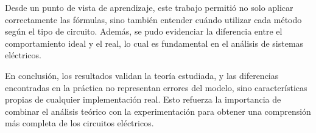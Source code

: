 \documentclass[conference]{IEEEtran}
\begin{document}
Desde un punto de vista de aprendizaje, este trabajo permitió no solo aplicar correctamente 
las fórmulas, sino también entender cuándo utilizar cada método según el tipo de circuito. 
Además, se pudo evidenciar la diferencia entre el comportamiento ideal y el real, lo cual es 
fundamental en el análisis de sistemas eléctricos.

En conclusión, los resultados validan la teoría estudiada, y las diferencias encontradas en 
la práctica no representan errores del modelo, sino características propias de cualquier 
implementación real. Esto refuerza la importancia de combinar el análisis teórico con la 
experimentación para obtener una comprensión más completa de los circuitos eléctricos.
\end{document}
